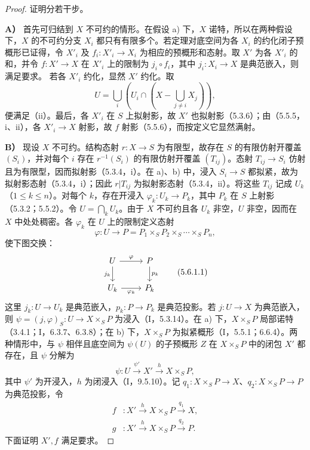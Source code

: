 \begin{proof}
证明分若干步。

\textbf{A）} 首先可归结到 $X$ 不可约的情形。在假设 a) 下，$X$ 诺特，所以在两种假设下，$X$ 的不可约分支 $X_i$ 都只有有限多个。若定理对底空间为各 $X_i$ 的约化闭子预概形已证得，令 $X'_i$ 及 $f_i:X'_i\to X_i$ 为相应的预概形和态射。取 $X'$ 为各 $X'_i$ 的和，并令 $f:X'\to X$ 在 $X'_i$ 上的限制为 $j_i\circ f_i$，其中 $j_i:X_i\to X$ 是典范嵌入，则满足要求。
若各 $X'_i$ 约化，显然 $X'$ 约化。取
\[
U=\bigcup_i\left(U_i\cap\left(X-\bigcup_{j\ne i}X_j\right)\right),
\]
便满足（ii）。最后，各 $X'_i$ 在 $S$ 上拟射影，故 $X'$ 也拟射影（5.3.6）；由（5.5.5，i、ii），各 $X'_i\to X$ 射影，故 $f$ 射影（5.5.6），而按定义它显然满射。

\textbf{B）} 现设 $X$ 不可约。结构态射 $r:X\to S$ 为有限型，故存在 $S$ 的有限仿射开覆盖 $(S_i)$，并对每个 $i$ 存在 $r^{-1}(S_i)$ 的有限仿射开覆盖 $(T_{ij})$。态射 $T_{ij}\to S_i$ 仿射且为有限型，因而拟射影（5.3.4，i）。在 a)、b) 中，浸入 $S_i\to S$ 都拟紧，故为拟射影态射（5.3.4，i）；因此 $r|T_{ij}$ 为拟射影态射（5.3.4，ii）。将这些 $T_{ij}$ 记成 $U_k$（$1\leq k\leq n$）。对每个 $k$，存在开浸入 $\varphi_k:U_k\to P_k$，其中 $P_k$ 在 $S$ 上射影（5.3.2；5.5.2）。令 $U=\bigcap_kU_k$。由于 $X$ 不可约且各 $U_k$ 非空，$U$ 非空，因而在 $X$ 中处处稠密。各 $\varphi_k$ 在 $U$ 上的限制定义态射
\[
\varphi:U\longrightarrow P=P_1\times_S P_2\times_S\cdots\times_S P_n,
\]
使下图交换：
\begin{equation}
\begin{tikzcd}
U\arrow[r,"\varphi"]\arrow[d,"j_k"']&P\arrow[d,"p_k"]\\
U_k\arrow[r,"\varphi_k"']&P_k
\end{tikzcd}
\tag{5.6.1.1}
\end{equation}
这里 $j_k:U\to U_k$ 是典范嵌入，$p_k:P\to P_k$ 是典范投影。若 $j:U\to X$ 为典范嵌入，则
$\psi=(j,\varphi)_S:U\to X\times_S P$ 为浸入（I，5.3.14）。在 a) 下，$X\times_S P$ 局部诺特（3.4.1；I，6.3.7、6.3.8）；在 b) 下，$X\times_S P$ 为拟紧概形（I，5.5.1；6.6.4）。两种情形中，与 $\psi$ 相伴且底空间为 $\psi(U)$ 的子预概形 $Z$ 在 $X\times_S P$ 中的闭包 $X'$ 都存在，且 $\psi$ 分解为
\begin{equation}
\psi:U\xrightarrow{\psi'}X'\xrightarrow{h}X\times_S P,
\tag{5.6.1.2}
\end{equation}
其中 $\psi'$ 为开浸入，$h$ 为闭浸入（I，9.5.10）。记 $q_1:X\times_S P\to X$、$q_2:X\times_S P\to P$ 为典范投影，令
\begin{align}
f &:X'\xrightarrow{h}X\times_S P\xrightarrow{q_1}X,
\tag{5.6.1.3}\\
g &:X'\xrightarrow{h}X\times_S P\xrightarrow{q_2}P.
\tag{5.6.1.4}
\end{align}
下面证明 $X',f$ 满足要求。


\end{proof}
